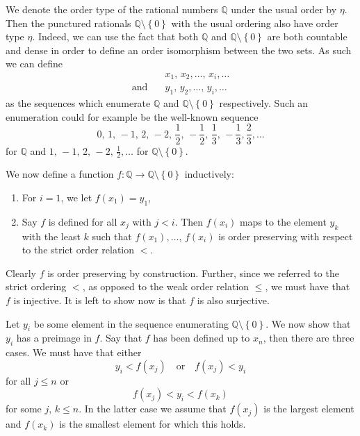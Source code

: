 \documentclass[../../main.tex]{subfiles}
\begin{document}
\begin{example}\cite[Exercise 2.3]{Ros82}
    We denote the order type of the rational numbers $\mathbb{Q}$ under the usual order by $\eta$.
    Then the punctured rationals $\mathbb{Q} \setminus \left\{0\right\}$ with the usual ordering also have order type $\eta$.
    Indeed, we can use the fact that both $\mathbb{Q}$ and $\mathbb{Q} \setminus \left\{0\right\}$ are both countable and dense in order to define an order isomorphism between the two sets.
    As such we can define 
    \begin{align*}
        & x_1,\, x_2,\ldots,\, x_i,\ldots \\
        \text{and} \quad & y_1,\, y_2,\ldots,\, y_i,\ldots
    \end{align*}
    as the sequences which enumerate $\mathbb{Q}$ and $\mathbb{Q} \setminus \left\{0\right\}$ respectively.
    Such an enumeration could for example be the well-known sequence 
    $$0,\, 1,\, -1,\, 2,\, -2,\, \frac{1}{2},\, -\frac{1}{2},\, \frac{1}{3},\, -\frac{1}{3}, \frac{2}{3},\ldots$$
    for $\mathbb{Q}$ and $1,\, -1,\, 2,\, -2,\, \frac{1}{2},\ldots$ for $\mathbb{Q} \setminus \left\{0\right\}$.

    We now define a function $f: \mathbb{Q} \to \mathbb{Q} \setminus \left\{0\right\}$ inductively:
    \begin{enumerate}
        \item For $i=1$, we let $f(x_1) = y_1$,
        \item Say $f$ is defined for all $x_j$ with $j < i$.
        Then $f(x_i)$ maps to the element $y_k$ with the least $k$
        such that $f(x_1),\ldots,\, f(x_i)$ is order preserving with respect to the strict order relation $<$.
    \end{enumerate}
    Clearly $f$ is order preserving by construction.
    Further, since we referred to the strict ordering $<$, as opposed to the weak order relation $\leq$,
    we must have that $f$ is injective.
    It is left to show now is that $f$ is also surjective.

    Let $y_i$ be some element in the sequence enumerating $\mathbb{Q} \setminus \left\{0\right\}$.
    We now show that $y_i$ has a preimage in $f$.
    Say that $f$ has been defined up to $x_n$, then there are three cases.
    We must have that either $$y_i < f(x_j)\quad \text{or} \quad f(x_j) < y_i$$ for all $j \leq n$ or $$f(x_j) < y_i < f(x_k)$$ for some $j,\, k \leq n$.
    In the latter case we assume that $f(x_j)$ is the largest element and $f(x_k)$ is the smallest element for which this holds.


\end{example}
\end{document}
